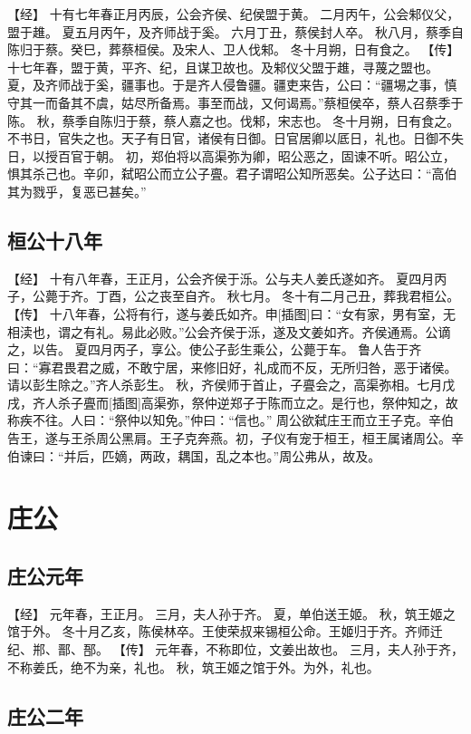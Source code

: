 \documentclass[a4paper,12pt,UTF8,twoside]{ctexbook}
\begin{document}
【经】
十有七年春正月丙辰，公会齐侯、纪侯盟于黄。
二月丙午，公会邾仪父，盟于趡。
夏五月丙午，及齐师战于奚。
六月丁丑，蔡侯封人卒。
秋八月，蔡季自陈归于蔡。癸巳，葬蔡桓侯。及宋人、卫人伐邾。
冬十月朔，日有食之。
【传】
十七年春，盟于黄，平齐、纪，且谋卫故也。及邾仪父盟于趡，寻蔑之盟也。
夏，及齐师战于奚，疆事也。于是齐人侵鲁疆。疆吏来告，公曰：“疆埸之事，慎守其一而备其不虞，姑尽所备焉。事至而战，又何谒焉。”蔡桓侯卒，蔡人召蔡季于陈。
秋，蔡季自陈归于蔡，蔡人嘉之也。伐邾，宋志也。
冬十月朔，日有食之。不书日，官失之也。天子有日官，诸侯有日御。日官居卿以厎日，礼也。日御不失日，以授百官于朝。
初，郑伯将以高渠弥为卿，昭公恶之，固谏不听。昭公立，惧其杀己也。辛卯，弑昭公而立公子亹。君子谓昭公知所恶矣。公子达曰：“高伯其为戮乎，复恶已甚矣。”

\chapter{桓公十八年}

【经】
十有八年春，王正月，公会齐侯于泺。公与夫人姜氏遂如齐。
夏四月丙子，公薨于齐。丁酉，公之丧至自齐。
秋七月。
冬十有二月己丑，葬我君桓公。
【传】
十八年春，公将有行，遂与姜氏如齐。申[插图]曰：“女有家，男有室，无相渎也，谓之有礼。易此必败。”公会齐侯于泺，遂及文姜如齐。齐侯通焉。公谪之，以告。
夏四月丙子，享公。使公子彭生乘公，公薨于车。
鲁人告于齐曰：“寡君畏君之威，不敢宁居，来修旧好，礼成而不反，无所归咎，恶于诸侯。请以彭生除之。”齐人杀彭生。
秋，齐侯师于首止，子亹会之，高渠弥相。七月戊戌，齐人杀子亹而[插图]高渠弥，祭仲逆郑子于陈而立之。是行也，祭仲知之，故称疾不往。人曰：“祭仲以知免。”仲曰：“信也。”
周公欲弑庄王而立王子克。辛伯告王，遂与王杀周公黑肩。王子克奔燕。初，子仪有宠于桓王，桓王属诸周公。辛伯谏曰：“并后，匹嫡，两政，耦国，乱之本也。”周公弗从，故及。

\part{庄公}

\chapter{庄公元年}

【经】
元年春，王正月。
三月，夫人孙于齐。
夏，单伯送王姬。
秋，筑王姬之馆于外。
冬十月乙亥，陈侯林卒。王使荣叔来锡桓公命。王姬归于齐。齐师迁纪、郱、鄑、郚。
【传】
元年春，不称即位，文姜出故也。
三月，夫人孙于齐，不称姜氏，绝不为亲，礼也。
秋，筑王姬之馆于外。为外，礼也。

\chapter{庄公二年}
\end{document}
